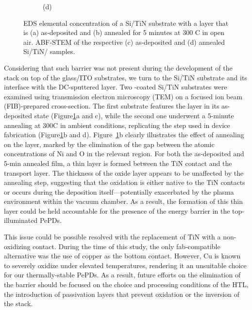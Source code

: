 \begin{figure}[htbp]
\begin{subfigure}[t]{0.35\textwidth}
        \caption*{(d)}
    \end{subfigure}
    \caption[EDS elemental concentration and ABF-STEM of an as-deposited and an annealed Si/TiN substrate.]{EDS elemental concentration of a Si/TiN substrate with a  layer that is (a) as-deposited and (b) annealed for 5 minutes at 300 \degree C in open air. ABF-STEM of the respective (c) as-deposited and (d) annealed Si/TiN/ samples.}
    \label{fig:pix_pepd:tem_on_nio}
\end{figure}

Considering that such barrier was not present during the development of the stack on top of the glass/ITO substrates, we turn to the Si/TiN substrate and its interface with the DC-sputtered  layer. Two -coated Si/TiN substrates were examined using transmission electron microscopy (TEM) on a focused ion beam (FIB)-prepared cross-section. The first substrate features the  layer in its as-deposited state (Figure\ref{fig:pix_pepd:tem_on_nio}a and c), while the second one underwent a 5-minute annealing at 300\degree C in ambient conditions, replicating the step used in device fabrication (Figure\ref{fig:pix_pepd:tem_on_nio}b and d). Figure~\ref{fig:pix_pepd:tem_on_nio}b clearly illustrates the effect of annealing on the  layer, marked by the elimination of the gap between the atomic concentrations of Ni and O in the relevant region. For both the as-deposited and 5-min annealed film, a thin  layer is formed between the TiN contact and the  transport layer. The thickness of the oxide layer appears to be unaffected by the annealing step, suggesting that the oxidation is either native to the TiN contacts or  occurs during the  deposition itself—potentially exacerbated by the plasma environment within the vacuum chamber. As a result, the formation of this thin  layer could be held accountable for the presence of the energy barrier in the top-illuminated PePDs. 

This issue could be possible resolved with the replacement of TiN with a non-oxidizing contact. During the time of this study, the only fab-compatible alternative was the use of copper as the bottom contact. However, Cu is known to severely oxidize under elevated temperatures, rendering it an unsuitable choice for our thermally-stable PePDs. As a result, future efforts on the elimination of the  barrier should be focused on the choice and processing conditions of the HTL, the introduction of passivation layers that prevent oxidation or the inversion of the stack. 

